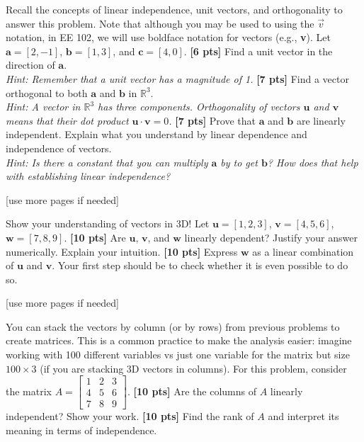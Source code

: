 \documentclass{ee102_pset}
\author{\rule{3cm}{0.4pt}} %
\begin{document}
 Recall the concepts of linear independence, unit vectors, and orthogonality to answer this problem. Note that although you may be used to using the $\vec{v}$ notation, in EE 102, we will use boldface notation for vectors (e.g., \textbf{v}).
Let $\textbf{a} = [2, -1]$, $\textbf{b} = [1, 3]$, and $\textbf{c} = [4, 0]$.
\problempart \textbf{[6 pts]} Find a unit vector in the direction of $\textbf{a}$. \\ 
\textit{Hint: Remember that a unit vector has a magnitude of 1.}
\problempart \textbf{[7 pts]} Find a vector orthogonal to both $\textbf{a}$ and $\textbf{b}$ in $\mathbb{R}^3$. \\ \textit{Hint: A vector in $\mathbb{R}^3$ has three components. Orthogonality of vectors $\textbf{u}$ and $\textbf{v}$ means that their dot product $\textbf{u} \cdot \textbf{v} = 0$.}
\problempart \textbf{[7 pts]} Prove that $\textbf{a}$ and $\textbf{b}$ are linearly independent. Explain what you understand by linear dependence and independence of vectors.\\ \textit{Hint: Is there a constant that you can multiply $\textbf{a}$ by to get $\textbf{b}$? How does that help with establishing linear independence?}
\vspace*{\fill}
\begin{center}
[use more pages if needed]
\end{center}




 Show your understanding of vectors in 3D! 
Let $\textbf{u} = [1, 2, 3]$, $\textbf{v} = [4, 5, 6]$, $\textbf{w} = [7, 8, 9]$.
\problempart \textbf{[10 pts]} Are $\textbf{u}$, $\textbf{v}$, and $\textbf{w}$ linearly dependent? Justify your answer numerically. Explain your intuition.
\problempart \textbf{[10 pts]} Express $\textbf{w}$ as a linear combination of $\textbf{u}$ and $\textbf{v}$. Your first step should be to check whether it is even possible to do so.



\vspace*{\fill}
\begin{center}
[use more pages if needed]
\end{center}

 You can stack the vectors by column (or by rows) from previous problems to create matrices. This is a common practice to make the analysis easier: imagine working with 100 different variables vs just one variable for the matrix but size $100 \times 3$ (if you are stacking 3D vectors in columns).
For this problem, consider the matrix $A = \begin{bmatrix} 1 & 2 & 3 \\ 4 & 5 & 6 \\ 7 & 8 & 9 \end{bmatrix}$.
\problempart \textbf{[10 pts]} Are the columns of $A$ linearly independent? Show your work.
\problempart \textbf{[10 pts]} Find the rank of $A$ and interpret its meaning in terms of independence.
\end{document}
